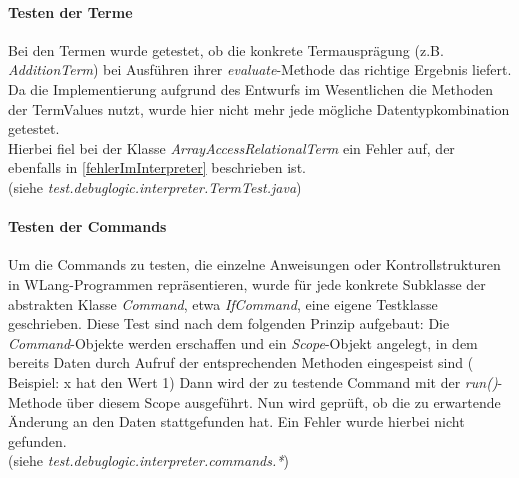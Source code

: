 \documentclass[parskip=full]{scrartcl}
\begin{document}
\paragraph{Testen der Terme}
Bei den Termen wurde getestet, ob die konkrete Termausprägung (z.B. \textit{AdditionTerm}) bei Ausführen ihrer \textit{evaluate}-Methode das richtige Ergebnis liefert. \\
Da die Implementierung aufgrund des Entwurfs im Wesentlichen die Methoden der TermValues nutzt, wurde hier nicht mehr jede mögliche Datentypkombination getestet.\\
Hierbei fiel bei der Klasse \textit{ArrayAccessRelationalTerm} ein Fehler auf, der ebenfalls in \ref{fehlerImInterpreter} beschrieben ist. \\
(siehe \textit{test.debuglogic.interpreter.TermTest.java})
\paragraph{Testen der Commands}
Um die Commands zu testen, die einzelne Anweisungen oder Kontrollstrukturen in WLang-Programmen repräsentieren, wurde für jede konkrete Subklasse der abstrakten Klasse \textit{Command}, etwa \textit{IfCommand}, eine eigene Testklasse geschrieben. Diese Test sind nach dem folgenden Prinzip aufgebaut: Die \textit{Command}-Objekte werden erschaffen und ein \textit{Scope}-Objekt angelegt, in dem bereits Daten durch Aufruf der entsprechenden Methoden eingespeist sind ( Beispiel: x hat den Wert 1)
Dann wird der zu testende Command mit der \textit{run()}-Methode über diesem Scope ausgeführt. Nun wird geprüft, ob die zu erwartende Änderung an den Daten stattgefunden hat.
Ein Fehler wurde hierbei nicht gefunden.\\
(siehe \textit{test.debuglogic.interpreter.commands.*})
\end{document}
